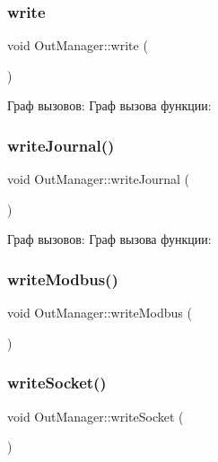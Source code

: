 \mbox{\label{class_out_manager_a04f085f9812ba6d105a8d13344f1ba8f}} 
\subsubsection{\texorpdfstring{write}{write}}
{\footnotesize\ttfamily void Out\+Manager\+::write (\begin{DoxyParamCaption}{ }\end{DoxyParamCaption})\hspace{0.3cm}{\ttfamily [slot]}}

Граф вызовов\+:
Граф вызова функции\+:
\mbox{\label{class_out_manager_a72350f29d5beb0ddcbf14071b4d609a8}} 
\subsubsection{\texorpdfstring{write\+Journal()}{writeJournal()}}
{\footnotesize\ttfamily void Out\+Manager\+::write\+Journal (\begin{DoxyParamCaption}{ }\end{DoxyParamCaption})}

Граф вызовов\+:
Граф вызова функции\+:
\mbox{\label{class_out_manager_aa04ed17d925a73577e08152120e50339}} 
\subsubsection{\texorpdfstring{write\+Modbus()}{writeModbus()}}
{\footnotesize\ttfamily void Out\+Manager\+::write\+Modbus (\begin{DoxyParamCaption}{ }\end{DoxyParamCaption})}

\mbox{\label{class_out_manager_a754a7835198dacb9a0dffcc772cdd454}} 
\subsubsection{\texorpdfstring{write\+Socket()}{writeSocket()}}
{\footnotesize\ttfamily void Out\+Manager\+::write\+Socket (\begin{DoxyParamCaption}{ }\end{DoxyParamCaption})}

